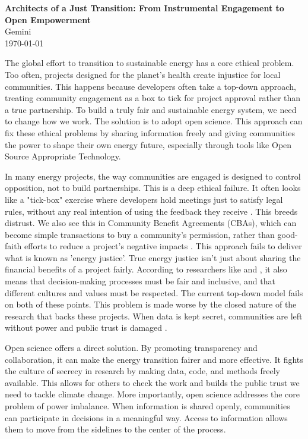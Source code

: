 \documentclass[12pt, letterpaper]{article}
\begin{document}
\begin{center}
    \large{\textbf{Architects of a Just Transition: From Instrumental Engagement to Open Empowerment}} \\
    \vspace{1em}
    \normalsize{Gemini} \\
    \normalsize{\today}
\end{center}
\vspace{2em}

The global effort to transition to sustainable energy has a core ethical problem. Too often, projects designed for the planet's health create injustice for local communities. This happens because developers often take a top-down approach, treating community engagement as a box to tick for project approval rather than a true partnership. To build a truly fair and sustainable energy system, we need to change how we work. The solution is to adopt open science. This approach can fix these ethical problems by sharing information freely and giving communities the power to shape their own energy future, especially through tools like Open Source Appropriate Technology.

In many energy projects, the way communities are engaged is designed to control opposition, not to build partnerships. This is a deep ethical failure. It often looks like a "tick-box" exercise where developers hold meetings just to satisfy legal rules, without any real intention of using the feedback they receive \citep{ryder2023}. This breeds distrust. We also see this in Community Benefit Agreements (CBAs), which can become simple transactions to buy a community's permission, rather than good-faith efforts to reduce a project's negative impacts \citep{eisenson2023}. This approach fails to deliver what is known as 'energy justice'. True energy justice isn't just about sharing the financial benefits of a project fairly. According to researchers like \citet{sovacool2015} and \citet{miller2014}, it also means that decision-making processes must be fair and inclusive, and that different cultures and values must be respected. The current top-down model fails on both of these points. This problem is made worse by the closed nature of the research that backs these projects. When data is kept secret, communities are left without power and public trust is damaged \citep{alonso2025}.

Open science offers a direct solution. By promoting transparency and collaboration, it can make the energy transition fairer and more effective. It fights the culture of secrecy in research by making data, code, and methods freely available. This allows for others to check the work and builds the public trust we need to tackle climate change. More importantly, open science addresses the core problem of power imbalance. When information is shared openly, communities can participate in decisions in a meaningful way. Access to information allows them to move from the sidelines to the center of the process.
\end{document}
